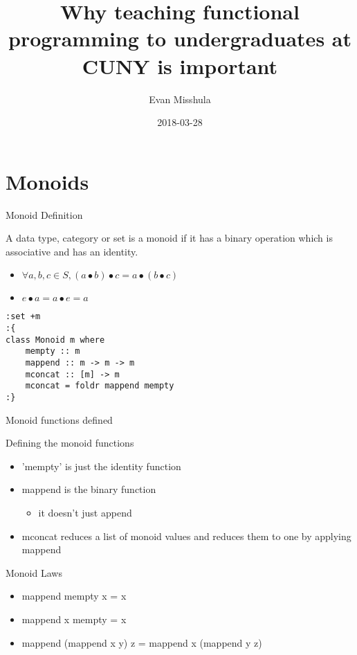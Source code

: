 \documentclass[presetation]{beamer}
\author{Evan Misshula}
\date{2018-03-28}
\title{Why teaching functional programming to undergraduates at CUNY is important}
\begin{document}
\maketitle





\section{Monoids}
\label{sec:org860c089}
\begin{frame}[fragile,label={sec:orga6509a5}]{Monoid Definition}
 \begin{definition}
A data type, category or set is a \alert{monoid} if it has a binary
operation \textbullet{} which is associative and has an identity.
\begin{itemize}
\item \(\forall a,b,c \in S, (a \bullet b) \bullet c = a \bullet (b \bullet c)\)
\item \(e \bullet a = a \bullet e = a\)
\end{itemize}

\begin{verbatim}
:set +m
:{
class Monoid m where
    mempty :: m
    mappend :: m -> m -> m
    mconcat :: [m] -> m
    mconcat = foldr mappend mempty
:}
\end{verbatim}
\end{definition}
\end{frame}

\begin{frame}[label={sec:org65f3680}]{Monoid functions defined}
\begin{block}{Defining the monoid functions}
\begin{itemize}
\item 'mempty' is just the identity function
\item mappend is the binary function
\begin{itemize}
\item \alert{it doesn't just append}
\end{itemize}
\item mconcat reduces a list of monoid values and reduces them to one by
applying mappend
\end{itemize}
\end{block}
\end{frame}

\begin{frame}[label={sec:org8ab1b3a}]{Monoid Laws}
\begin{theorem}
\begin{itemize}
\item mappend mempty x = x
\item mappend x mempty = x
\item mappend (mappend x y) z = mappend x (mappend y z)
\end{itemize}
\end{theorem}
\end{frame}
\end{document}
